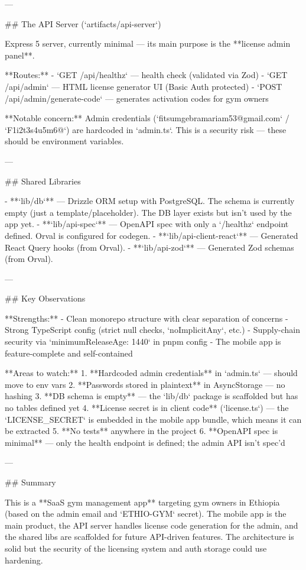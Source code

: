 ---

## The API Server (`artifacts/api-server`)

Express 5 server, currently minimal — its main purpose is the **license admin panel**.

**Routes:**
- `GET /api/healthz` — health check (validated via Zod)
- `GET /api/admin` — HTML license generator UI (Basic Auth protected)
- `POST /api/admin/generate-code` — generates activation codes for gym owners

**Notable concern:** Admin credentials (`fitsumgebramariam53@gmail.com` / `F1i2t3s4u5m6@`) are hardcoded in `admin.ts`. This is a security risk — these should be environment variables.

---

## Shared Libraries

- **`lib/db`** — Drizzle ORM setup with PostgreSQL. The schema is currently empty (just a template/placeholder). The DB layer exists but isn't used by the app yet.
- **`lib/api-spec`** — OpenAPI spec with only a `/healthz` endpoint defined. Orval is configured for codegen.
- **`lib/api-client-react`** — Generated React Query hooks (from Orval).
- **`lib/api-zod`** — Generated Zod schemas (from Orval).

---

## Key Observations

**Strengths:**
- Clean monorepo structure with clear separation of concerns
- Strong TypeScript config (strict null checks, `noImplicitAny`, etc.)
- Supply-chain security via `minimumReleaseAge: 1440` in pnpm config
- The mobile app is feature-complete and self-contained

**Areas to watch:**
1. **Hardcoded admin credentials** in `admin.ts` — should move to env vars
2. **Passwords stored in plaintext** in AsyncStorage — no hashing
3. **DB schema is empty** — the `lib/db` package is scaffolded but has no tables defined yet
4. **License secret is in client code** (`license.ts`) — the `LICENSE_SECRET` is embedded in the mobile app bundle, which means it can be extracted
5. **No tests** anywhere in the project
6. **OpenAPI spec is minimal** — only the health endpoint is defined; the admin API isn't spec'd

---

## Summary

This is a **SaaS gym management app** targeting gym owners in Ethiopia (based on the admin email and `ETHIO-GYM` secret). The mobile app is the main product, the API server handles license code generation for the admin, and the shared libs are scaffolded for future API-driven features. The architecture is solid but the security of the licensing system and auth storage could use hardening.



